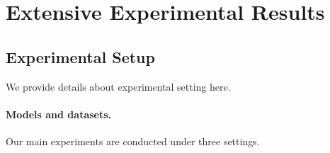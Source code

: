 \newpage
\section{Extensive Experimental Results}
\label{appendix: extensive experimental results}

\subsection{Experimental Setup}
\label{appendix: experimental setup}
We provide details about experimental setting here.

\paragraph{Models and datasets.}
Our main experiments are conducted under three settings.

